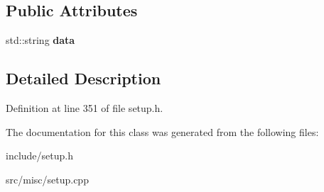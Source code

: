 \subsection*{Public Attributes}
\begin{DoxyCompactItemize}
\item 
\hypertarget{classSection__prop_ae7bf54358e7533b1d3eae4dc433c0892}{std\-::string {\bfseries data}}\label{classSection__prop_ae7bf54358e7533b1d3eae4dc433c0892}

\end{DoxyCompactItemize}


\subsection{Detailed Description}


Definition at line 351 of file setup.\-h.



The documentation for this class was generated from the following files\-:\begin{DoxyCompactItemize}
\item 
include/setup.\-h\item 
src/misc/setup.\-cpp\end{DoxyCompactItemize}
